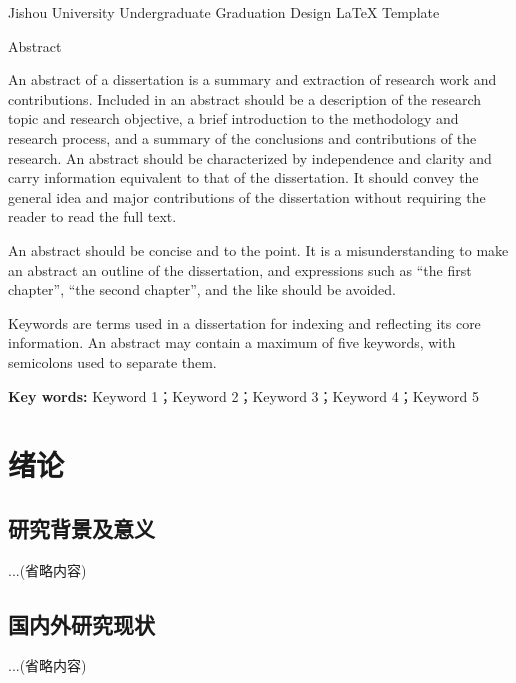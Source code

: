 \documentclass[12pt, a4paper, fontset=fandol]{ctexart}
\numberwithin{equation}{section}
\begin{document}
\begin{center}
  {\engfont{}Jishou University Undergraduate Graduation Design \LaTeX{} Template\par}
  \vspace{\baselineskip}
  {\engfont{}Abstract\par}
  \vspace{\baselineskip}
\end{center}
{}
{\engfont{}
\hspace*{2em}An abstract of a dissertation is a summary and extraction of research work and contributions. Included in an abstract should be a description of the research topic and research objective, a brief introduction to the methodology and research process, and a summary of the conclusions and contributions of the research. An abstract should be characterized by independence and clarity and carry information equivalent to that of the dissertation. It should convey the general idea and major contributions of the dissertation without requiring the reader to read the full text.

An abstract should be concise and to the point. It is a misunderstanding to make an abstract an outline of the dissertation, and expressions such as “the first chapter”, “the second chapter”, and the like should be avoided.

Keywords are terms used in a dissertation for indexing and reflecting its core information. An abstract may contain a maximum of five keywords, with semicolons used to separate them.

\noindent \textbf{Key words:} Keyword 1；Keyword 2；Keyword 3；Keyword 4；Keyword 5\par
}


\newpage
\clearpage
{}


\section{绪论}

\subsection{研究背景及意义}
...(省略内容)

\subsection{国内外研究现状}
...(省略内容)
\end{document}
